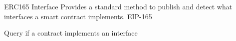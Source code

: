 \documentclass[handout]{beamer}
\begin{document}

\begin{frame}{ERC165 Interface}
Provides a standard method to publish and detect what interfaces a smart contract implements. \link \href{https://eips.ethereum.org/EIPS/eip-165}{EIP-165}
\vspace{1em}
	\begin{samplecode}{Query if a contract implements an interface}
			
	\end{samplecode}

\end{frame}
\end{document}
